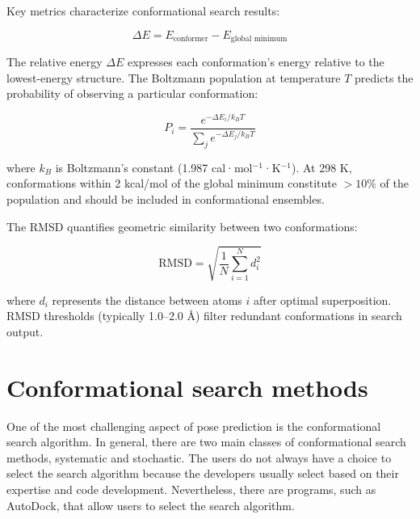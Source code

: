 \documentclass[12pt]{article}
\begin{document}
Key metrics characterize conformational search results:

\begin{equation}
\Delta E = E_{\text{conformer}} - E_{\text{global minimum}}
\label{eq:relative_energy}
\end{equation}

The relative energy $\Delta E$ expresses each conformation's energy relative to the lowest-energy structure. The Boltzmann population at temperature $T$ predicts the probability of observing a particular conformation:

\begin{equation}
P_i = \frac{e^{-\Delta E_i / k_B T}}{\sum_j e^{-\Delta E_j / k_B T}}
\label{eq:boltzmann}
\end{equation}

where $k_B$ is Boltzmann's constant (1.987 cal·mol$^{-1}$·K$^{-1}$). At 298 K, conformations within 2 kcal/mol of the global minimum constitute $>10\%$ of the population and should be included in conformational ensembles.

The RMSD quantifies geometric similarity between two conformations:

\begin{equation}
\text{RMSD} = \sqrt{\frac{1}{N} \sum_{i=1}^{N} d_i^2}
\label{eq:rmsd}
\end{equation}

where $d_i$ represents the distance between atoms $i$ after optimal superposition. RMSD thresholds (typically 1.0--2.0 \r{A}) filter redundant conformations in search output.


\section{Conformational search methods}
One of the most challenging aspect of pose prediction is the conformational search algorithm. In general, there are two main classes of conformational search methods, systematic and stochastic.  The users do not always have a choice to select the search algorithm because the developers usually select based on their expertise and code development. Nevertheless, there are programs, such as AutoDock, that allow users to select the search algorithm. 
\end{document}

